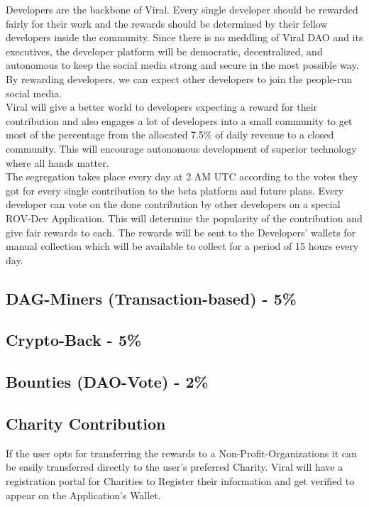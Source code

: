 \documentclass[10pt]{article}
\begin{document}
Developers are the backbone of Viral. Every single developer should be rewarded fairly for their work and the rewards should be determined by their fellow developers inside the community. Since there is no meddling of Viral DAO and its executives, the developer platform will be democratic, decentralized, and autonomous to keep the social media strong and secure in the most possible way. By rewarding developers, we can expect other developers to join the people-run social media.\\

Viral will give a better world to developers expecting a reward for their contribution and also engages a lot of developers into a small community to get most of the percentage from the allocated 7.5\% of daily revenue to a closed community. This will encourage autonomous development of superior technology where all hands matter. \\

The segregation takes place every day at 2 AM UTC according to the votes they got for every single contribution to the beta platform and future plans. Every developer can vote on the done contribution by other developers on a special ROV-Dev Application. This will determine the popularity of the contribution and give fair rewards to each. The rewards will be sent to the Developers' wallets for manual collection which will be available to collect for a period of 15 hours every day.\\

\subsection{DAG-Miners (Transaction-based) - 5\%}

\subsection{Crypto-Back - 5\%}

\subsection{Bounties (DAO-Vote) - 2\%}


\subsection{Charity Contribution}

If the user opts for transferring the rewards to a Non-Profit-Organizations it can be easily transferred directly to the user's preferred Charity. Viral will have a registration portal for Charities to Register their information and get verified to appear on the Application's Wallet.\\ 
\end{document}
